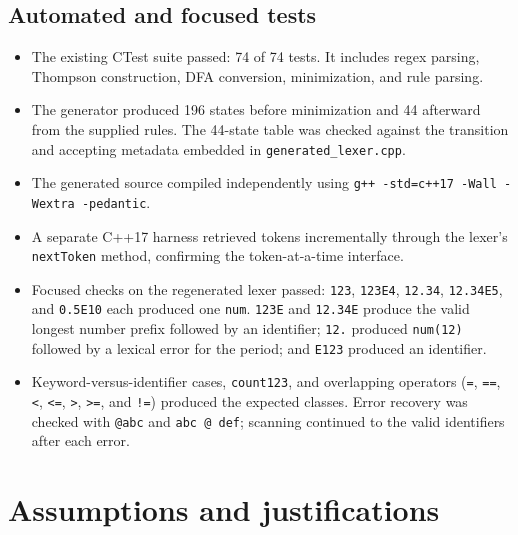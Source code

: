 \documentclass[11pt,a4paper]{article}
\newcommand{\code}[1]{\texttt{#1}}
\begin{document}
\subsection{Automated and focused tests}

\begin{itemize}
    \item The existing CTest suite passed: 74 of 74 tests. It includes
    regex parsing, Thompson construction, DFA conversion, minimization,
    and rule parsing.
    \item The generator produced 196 states before minimization and 44
    afterward from the supplied rules. The 44-state table was checked
    against the transition and accepting metadata embedded in
    \code{generated\_lexer.cpp}.
    \item The generated source compiled independently using
    \code{g++ -std=c++17 -Wall -Wextra -pedantic}.
    \item A separate C++17 harness retrieved tokens incrementally through
    the lexer's \code{nextToken} method, confirming the token-at-a-time
    interface.
    \item Focused checks on the regenerated lexer passed: \code{123},
    \code{123E4}, \code{12.34}, \code{12.34E5}, and \code{0.5E10}
    each produced one \code{num}. \code{123E} and \code{12.34E}
    produce the valid longest number
    prefix followed by an identifier; \code{12.} produced
    \code{num(12)} followed by a lexical error for the period; and
    \code{E123} produced an identifier.
    \item Keyword-versus-identifier cases, \code{count123}, and
    overlapping operators (\code{=}, \code{==}, \code{<}, \code{<=},
    \code{>}, \code{>=}, and \code{!=}) produced the expected classes.
    Error recovery was checked with \code{@abc} and \code{abc @ def};
    scanning continued to the valid identifiers after each error.
\end{itemize}

\section{Assumptions and justifications}
\end{document}
